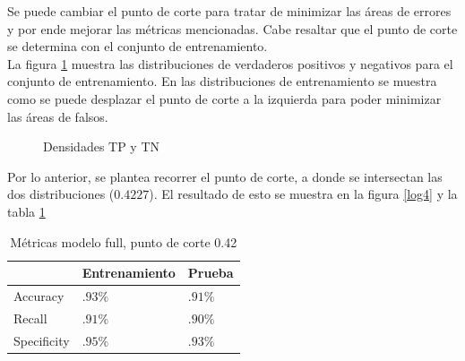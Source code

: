 \documentclass[12pt, letterpaper]{article}
\begin{document}
Se puede cambiar el punto de corte para tratar de minimizar las áreas de errores y por ende mejorar las métricas mencionadas. Cabe resaltar que el punto de corte se determina con el conjunto de entrenamiento.\\

La figura \ref{log2} muestra las distribuciones de verdaderos positivos y negativos para el conjunto de entrenamiento. En las distribuciones de entrenamiento se muestra como se puede desplazar el punto de corte a la izquierda para poder minimizar las áreas de falsos.

\begin{figure}[h]
 \centering
 \caption{Densidades TP y TN}
 \label{log2}
\end{figure}

Por lo anterior, se plantea recorrer el punto de corte, a donde se intersectan las dos distribuciones ($0.4227$). El resultado de esto se muestra en la figura \ref{log4} y la tabla \ref{log3}

\begin{table}[ht]
\centering
\begin{tabular}{|l|l|l|}
\hline
&Entrenamiento&Prueba\\
\hline\hline
Accuracy& $.93\%$ & $.91 \%$ \\ \hline
Recall & $.91\%$ & $.90 \%$ \\ \hline
Specificity & $.95\%$ & $.93 \%$ \\ \hline
\end{tabular}
\caption{Métricas modelo full, punto de corte 0.42}
\label{log3}
\end{table}
\end{document}
